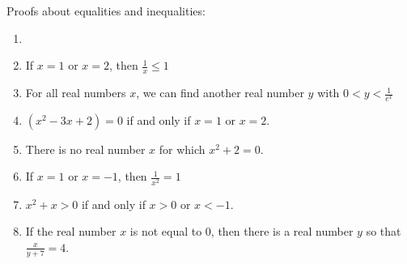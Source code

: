 Proofs about equalities and inequalities:

\begin{xca}
	\begin{enumerate}
				\item[] \mbox{}\\
		\item  If $x=1$ or $x=2$, then $\frac{1}{x} \leq 1$  %
		\item  For all real numbers $x$, we can find another real number $y$ with $0 < y < \frac{1}{e^x}$%
		\item  $(x^2-3x+2) = 0$ if and only if $x=1$ or $x=2$. %
		\item  There is no real number $x$ for which $x^2+2 = 0$. %
		\item  If $x=1$ or $x=-1$, then $ \frac{1}{x^2} = 1$  %
		\item  $x^2+x>0$ if and only if $x>0$ or $x<-1$.  %
		\item  If the real number $x$ is not equal to $0$, then there is a real number $y$ so that $\frac{x}{y+7}  = 4$.
		\end{enumerate}
	\end{xca}





